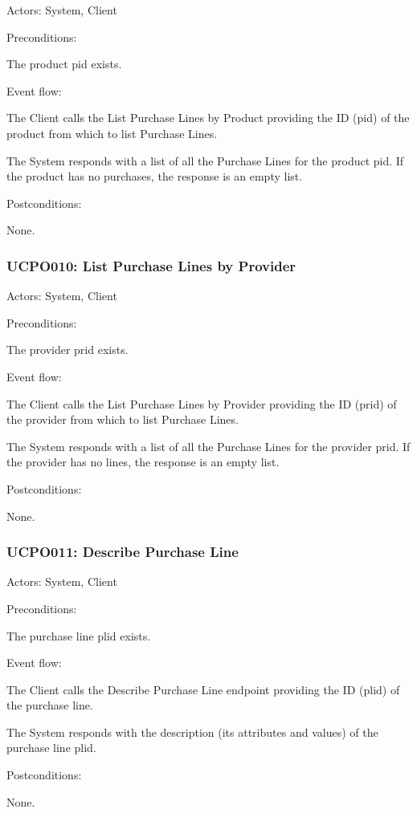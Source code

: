 Actors: System, Client

Preconditions:

\ucitem The product pid exists.

Event flow:

\ucitem The Client calls the List Purchase Lines by Product providing the ID (pid) of the product from which to list Purchase Lines.

\ucitem The System responds with a list of all the Purchase Lines for the product pid. If the product has no purchases, the response is an empty list.

Postconditions:

\ucitem None.

\subsubsection{UCPO010: List Purchase Lines by Provider}
\label{UCPO010}

Actors: System, Client

Preconditions:

\ucitem The provider prid exists.

Event flow:

\ucitem The Client calls the List Purchase Lines by Provider providing the ID (prid) of the provider from which to list Purchase Lines.

\ucitem The System responds with a list of all the Purchase Lines for the provider prid. If the provider has no lines, the response is an empty list.

Postconditions:

\ucitem None.

\subsubsection{UCPO011: Describe Purchase Line}
\label{UCPO011}

Actors: System, Client

Preconditions:

\ucitem The purchase line plid exists.

Event flow:

\ucitem The Client calls the Describe Purchase Line endpoint providing the ID (plid) of the purchase line.

\ucitem The System responds with the description (its attributes and values) of the purchase line plid.

Postconditions:

\ucitem None.

